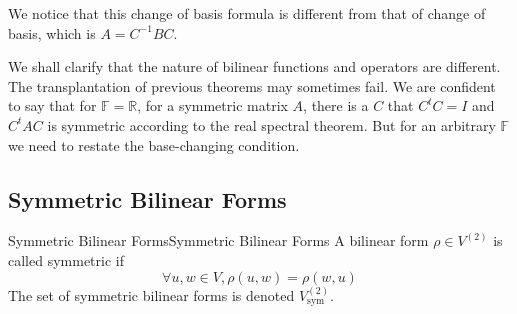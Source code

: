 \documentclass[../main.tex]{subfiles}
\begin{document}
\begin{remark}
We notice that this change of basis formula is different from that of change of basis, which is $A = C ^{-1}BC$.

We shall clarify that the nature of bilinear functions and operators are different. The transplantation of previous theorems may sometimes fail. We are confident to say that for $\mathbb{F}=\mathbb{R}$, for a symmetric matrix $A$, there is a $C$ that $C^tC=I$ and $C^tAC$ is symmetric according to the real spectral theorem. But for an arbitrary $\mathbb{F}$ we need to restate the base-changing condition.
\end{remark}

\subsection{Symmetric Bilinear Forms}

\begin{definition}{Symmetric Bilinear Forms}{Symmetric Bilinear Forms}
A bilinear form $\rho\in V^{(2)}$ is called symmetric if
\begin{equation*}
\forall u,w\in V,\rho(u,w) = \rho(w,u)
\end{equation*}
The set of symmetric bilinear forms is denoted $V_{\text{sym}}^{(2)}$.
\end{definition}
\end{document}
